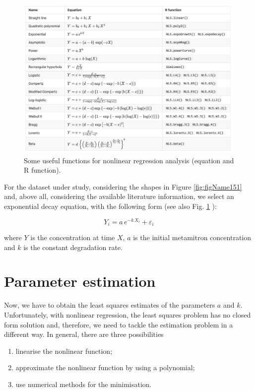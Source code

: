 \documentclass[a4paper,12pt,oneside]{book}
\providecommand{\tightlist}{%
  \setlength{\itemsep}{0pt}\setlength{\parskip}{0pt}}
\begin{document}
\begin{figure}

{\centering \includegraphics[width=0.95\linewidth]{_images/nonLinearEquations} 

}

\caption{Some useful functions for nonlinear regression analysis (equation and R function).}\label{fig:figName151bis}
\end{figure}

For the dataset under study, considering the shapes in Figure \ref{fig:figName151} and, above all, considering the available literature information, we select an exponential decay equation, with the following form (see also Fig. \ref{fig:figName151bis} ):

\[Y_i = a \, e^{-k \,X_i} + \varepsilon_i\]

where \(Y\) is the concentration at time \(X\), \(a\) is the initial metamitron concentration and \(k\) is the constant degradation rate.

\hypertarget{parameter-estimation-3}{%
\section{Parameter estimation}\label{parameter-estimation-3}}

Now, we have to obtain the least squares estimates of the parameters \(a\) and \(k\). Unfortunately, with nonlinear regression, the least squares problem has no closed form solution and, therefore, we need to tackle the estimation problem in a different way. In general, there are three possibilities

\begin{enumerate}
\def\labelenumi{\arabic{enumi}.}
\tightlist
\item
  linearise the nonlinear function;
\item
  approximate the nonlinear function by using a polynomial;
\item
  use numerical methods for the minimisation.
\end{enumerate}
\end{document}
